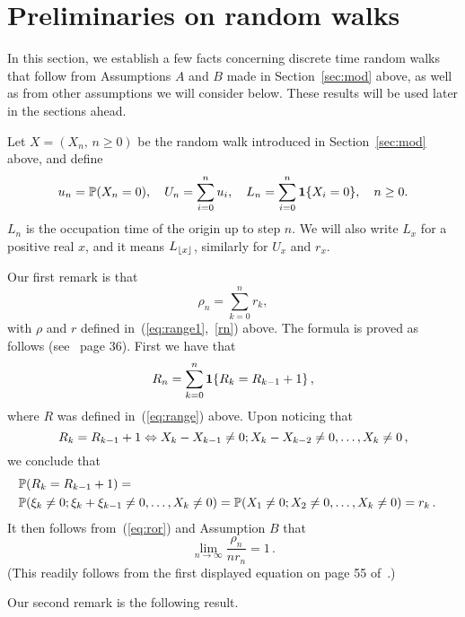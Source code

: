 \section{Preliminaries on random walks}
\label{sec:rw}
\setcounter{equation}{0}

In this section, we establish a few facts concerning discrete time random walks that follow from Assumptions  $A$ and  $B$ made in
Section~\ref{sec:mod}
above, as well as from other assumptions we will consider below. These results will be used later in the sections ahead.

Let $X=(X_n,\,n\geq0)$ be the random walk introduced in Section~\ref{sec:mod} above, and define 
\begin{equation}
\label{eq:run} 
u_n=\P(X_n=0),\quad U_n=\sum_{i=0}^nu_i,\quad L_n=\sum_{i=0}^n\1\{X_i=0\},\quad n\geq0.
\end{equation}
$L_n$ is the occupation time of the origin up to step $n$. We will also write $L_x$ for a positive real $x$, and it means $L_{\lfloor x\rfloor}$,
similarly for $U_x$ and $r_x$.

Our first remark is that 
\begin{equation}
\label{eq:ror} 
\rho_n=\sum_{k=0}^n r_k,
\end{equation}
with $\rho$ and $r$ defined in~(\ref{eq:range1},~\ref{rn}) above.
The formula is proved as follows (see~\cite{kn:S} page 36). First we have that
\begin{equation}\nonumber
R_n=\sum_{k=0}^n {\mathbf 1}\{R_k=R_{k-1}+1\}\,, 
\end{equation}
where $R$ was defined in~(\ref{eq:range}) above. Upon noticing that 
\begin{equation}\nonumber
R_k=R_{k-1}+1\Leftrightarrow X_k-X_{k-1}\not=0 ; X_k-X_{k-2}\not=0,\ldots,X_k\not=0\,,
\end{equation}
we conclude that 
\begin{eqnarray*}%
&\P(R_k=R_{k-1}+1)=&\\
&\P(\xi_k\not=0;\xi_k+\xi_{k-1}\not=0,\ldots,X_k\not=0)
=\P(X_1\not=0;X_2\not=0,\ldots,X_k\not=0)=r_k\,.&
\end{eqnarray*}%
 It then follows from~(\ref{eq:ror}) and Assumption  $B$ that 
\begin{equation}
\label{eq:ronr} 
\lim_{n\to\infty}\frac{\rho_n}{nr_n}=1\,.
\end{equation}
(This readily follows from the first displayed equation on page 55 of~\cite{kn:Se}.)

Our second remark is the following result.


